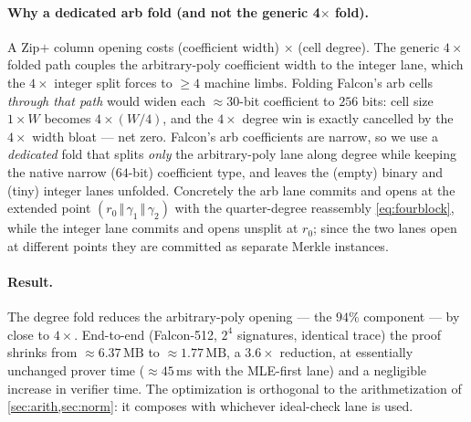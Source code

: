 \paragraph{Why a dedicated arb fold (and not the generic 4$\times$ fold).}
A Zip$+$ column opening costs (coefficient width) $\times$ (cell degree).
The generic $4\times$ folded path couples the arbitrary-poly coefficient
width to the integer lane, which the $4\times$ integer split forces to
$\ge 4$ machine limbs. Folding Falcon's arb cells \emph{through that path}
would widen each $\approx 30$-bit coefficient to $256$ bits: cell size
$1{\times}W$ becomes $4{\times}(W/4)$, and the $4\times$ degree win is
exactly cancelled by the $4\times$ width bloat --- net zero. Falcon's arb
coefficients are narrow, so we use a \emph{dedicated} fold that splits
\emph{only} the arbitrary-poly lane along degree while keeping the native
narrow ($64$-bit) coefficient type, and leaves the (empty) binary and
(tiny) integer lanes unfolded. Concretely the arb lane commits and opens at
the extended point $(r_0\,\Vert\,\gamma_1\,\Vert\,\gamma_2)$ with the
quarter-degree reassembly \eqref{eq:fourblock}, while the integer lane
commits and opens unsplit at $r_0$; since the two lanes open at different
points they are committed as separate Merkle instances.

\paragraph{Result.}
The degree fold reduces the arbitrary-poly opening --- the $94\%$
component --- by close to $4\times$. End-to-end (Falcon-512, $2^4$
signatures, identical trace) the proof shrinks from
\(\approx 6.37\,\mathrm{MB}\) to \(\approx 1.77\,\mathrm{MB}\), a
\(\mathbf{3.6\times}\) reduction, at essentially unchanged prover time
($\approx 45\,$ms with the MLE-first lane) and a negligible increase in
verifier time. The optimization is orthogonal to the arithmetization of
\cref{sec:arith,sec:norm}: it composes with whichever ideal-check lane is
used.
